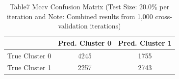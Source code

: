 
\begin{table}[htbp]
    \centering
    \small
    \caption{Table7 Mccv Confusion Matrix
    (Test Size: 20.0\% per iteration and Note: Combined results from 1,000 cross-validation iterations)}
    \label{tab:table7_mccv_confusion_matrix}
    \begin{tabular}{lcc}
        \toprule
         & Pred. Cluster 0 & Pred. Cluster 1 \\
        \midrule
        True Cluster 0 & 4245 & 1755 \\
        True Cluster 1 & 2257 & 2743 \\
        \bottomrule
    \end{tabular}
\end{table}
